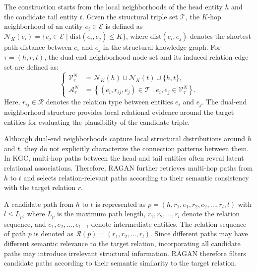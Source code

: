 \documentclass[a4paper,fleqn]{cas-sc}
\begin{document}
The construction starts from the local neighborhoods of the head entity $h$ and the candidate tail entity $t$. Given the structural triple set $\mathcal{T}$, the $K$-hop neighborhood of an entity $e_i\in\mathcal{E}$ is defined as
$\mathcal{N}_{K}(e_i)=\{e_j\in\mathcal{E}\mid \mathrm{dist}(e_i,e_j)\leq K\}$,
where $\mathrm{dist}(e_i,e_j)$ denotes the shortest-path distance between $e_i$ and $e_j$ in the structural knowledge graph. For $\tau=(h,r,t)$, the dual-end neighborhood node set and its induced relation edge set are defined as:
\begin{equation}
\left\{
\begin{aligned}
\mathcal{V}_{\tau}^{N}
&=
\mathcal{N}_{K}(h)
\cup
\mathcal{N}_{K}(t)
\cup
\{h,t\}, \\
\mathcal{A}_{\tau}^{N}
&=
\left\{
(e_i,r_{ij},e_j)\in\mathcal{T}
\mid
e_i,e_j\in\mathcal{V}_{\tau}^{N}
\right\}.
\end{aligned}
\right.
\end{equation}
Here, $r_{ij}\in\mathcal{R}$ denotes the relation type between entities $e_i$ and $e_j$. The dual-end neighborhood structure provides local relational evidence around the target entities for evaluating the plausibility of the candidate triple.

Although dual-end neighborhoods capture local structural distributions around $h$ and $t$, they do not explicitly characterize the connection patterns between them. In KGC, multi-hop paths between the head and tail entities often reveal latent relational associations. Therefore, RAGAN further retrieves multi-hop paths from $h$ to $t$ and selects relation-relevant paths according to their semantic consistency with the target relation $r$.

A candidate path from $h$ to $t$ is represented as
$p=(h,r_1,e_1,r_2,e_2,\ldots,r_l,t)$ with $l\leq L_p$, where $L_p$ is the maximum path length, $r_1,r_2,\ldots,r_l$ denote the relation sequence, and $e_1,e_2,\ldots,e_{l-1}$ denote intermediate entities. The relation sequence of path $p$ is denoted as $\mathcal{R}(p)=(r_1,r_2,\ldots,r_l)$. Since different paths may have different semantic relevance to the target relation, incorporating all candidate paths may introduce irrelevant structural information. RAGAN therefore filters candidate paths according to their semantic similarity to the target relation.
\end{document}
